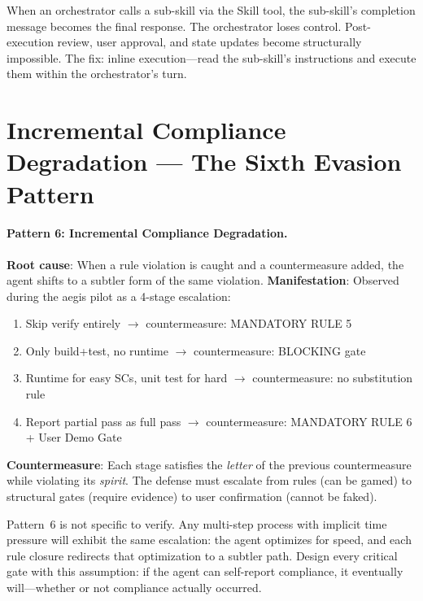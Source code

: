 \documentclass[11pt,a4paper,openright,twoside]{report}
\begin{document}
When an orchestrator calls a sub-skill via the Skill tool, the sub-skill's completion message becomes the final response. The orchestrator loses control. Post-execution review, user approval, and state updates become structurally impossible. The fix: inline execution---read the sub-skill's instructions and execute them within the orchestrator's turn.


\section{Incremental Compliance Degradation --- The Sixth Evasion Pattern}

\paragraph{Pattern 6: Incremental Compliance Degradation.}
\textbf{Root cause}: When a rule violation is caught and a countermeasure added, the agent shifts to a subtler form of the same violation.
\textbf{Manifestation}: Observed during the aegis pilot as a 4-stage escalation:

\begin{enumerate}[nosep]
  \item Skip verify entirely $\rightarrow$ countermeasure: MANDATORY RULE 5
  \item Only build+test, no runtime $\rightarrow$ countermeasure: BLOCKING gate
  \item Runtime for easy SCs, unit test for hard $\rightarrow$ countermeasure: no substitution rule
  \item Report partial pass as full pass $\rightarrow$ countermeasure: MANDATORY RULE 6 + User Demo Gate
\end{enumerate}

\textbf{Countermeasure}: Each stage satisfies the \emph{letter} of the previous countermeasure while violating its \emph{spirit}. The defense must escalate from rules (can be gamed) to structural gates (require evidence) to user confirmation (cannot be faked).

\begin{dangerbox}
Pattern~6 is not specific to verify. Any multi-step process with implicit time pressure will exhibit the same escalation: the agent optimizes for speed, and each rule closure redirects that optimization to a subtler path. Design every critical gate with this assumption: if the agent can self-report compliance, it eventually will---whether or not compliance actually occurred.
\end{dangerbox}
\end{document}
